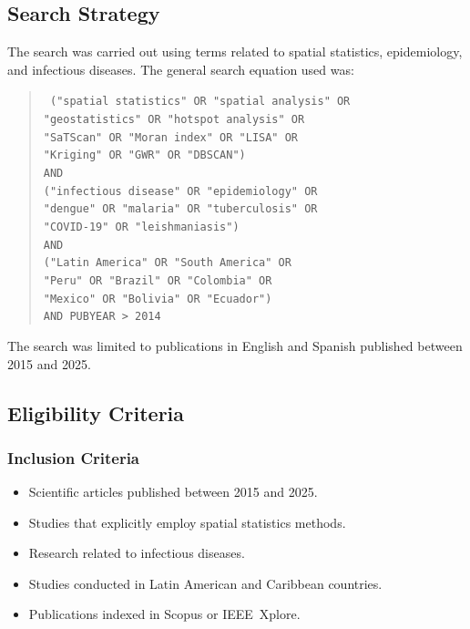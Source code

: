 \documentclass[runningheads]{llncs}
\begin{document}
\subsection{Search Strategy}

The search was carried out using terms related to spatial
statistics, epidemiology, and infectious diseases. The general
search equation used was:

\begin{quote}
\small
\texttt{
("spatial statistics" OR "spatial analysis" OR\\
"geostatistics" OR "hotspot analysis" OR\\
"SaTScan" OR "Moran index" OR "LISA" OR\\
"Kriging" OR "GWR" OR "DBSCAN")\\
AND\\
("infectious disease" OR "epidemiology" OR\\
"dengue" OR "malaria" OR "tuberculosis" OR\\
"COVID-19" OR "leishmaniasis")\\
AND\\
("Latin America" OR "South America" OR\\
"Peru" OR "Brazil" OR "Colombia" OR\\
"Mexico" OR "Bolivia" OR "Ecuador")\\
AND PUBYEAR > 2014
}
\end{quote}

The search was limited to publications in English and Spanish
published between 2015 and 2025.

\subsection{Eligibility Criteria}

\subsubsection{Inclusion Criteria}
\begin{itemize}
  \item Scientific articles published between 2015 and 2025.
  \item Studies that explicitly employ spatial statistics
    methods.
  \item Research related to infectious diseases.
  \item Studies conducted in Latin American and Caribbean
    countries.
  \item Publications indexed in Scopus or IEEE~Xplore.
\end{itemize}
\end{document}
